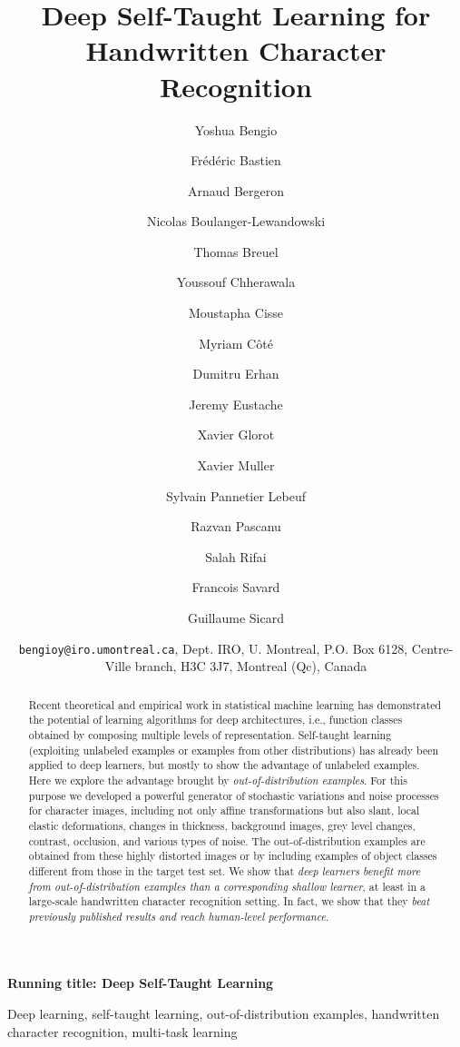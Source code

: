 \documentclass{article} %
\begin{document}
\title{Deep Self-Taught Learning for Handwritten Character Recognition}
\author{
Yoshua  Bengio \and
Frédéric  Bastien \and
Arnaud  Bergeron \and
Nicolas  Boulanger-Lewandowski \and
Thomas  Breuel \and
Youssouf  Chherawala \and
Moustapha  Cisse \and 
Myriam  Côté \and 
Dumitru  Erhan \and
Jeremy  Eustache \and
Xavier  Glorot \and 
Xavier  Muller \and
Sylvain  Pannetier Lebeuf \and
Razvan  Pascanu \and 
Salah  Rifai \and 
Francois  Savard \and 
Guillaume  Sicard 
}
\date{{\tt bengioy@iro.umontreal.ca}, Dept. IRO, U. Montreal, P.O. Box 6128, Centre-Ville branch, H3C 3J7, Montreal (Qc), Canada}
\editor{}

\maketitle

{\bf Running title: Deep Self-Taught Learning}

\begin{abstract}
  Recent theoretical and empirical work in statistical machine learning has demonstrated the potential of learning algorithms for deep architectures, i.e., function classes obtained by composing multiple levels of representation. Self-taught learning (exploiting unlabeled examples or examples from other distributions) has already been applied to deep learners, but mostly to show the advantage of unlabeled examples. Here we explore the advantage brought by {\em out-of-distribution examples}.  For this purpose we developed a powerful generator of stochastic variations and noise processes for character images, including not only affine transformations but also slant, local elastic deformations, changes in thickness, background images, grey level changes, contrast, occlusion, and various types of noise. The out-of-distribution examples are obtained from these highly distorted images or by including examples of object classes different from those in the target test set.  We show that {\em deep learners benefit more from out-of-distribution examples than a corresponding shallow learner}, at least in a large-scale handwritten character recognition setting. In fact, we show that they {\em beat previously published results and reach human-level performance}.
\end{abstract}

\begin{keywords}  
Deep learning, self-taught learning, out-of-distribution examples, handwritten character recognition, multi-task learning
\end{keywords}
\end{document}
